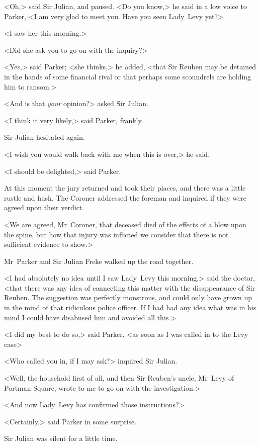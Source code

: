 <Oh,> said Sir Julian, and paused. <Do you know,> he said in a low voice to Parker, <I am very glad to meet you. Have you seen Lady~Levy yet?>

<I saw her this morning.>

<Did she ask you to go on with the inquiry?>

<Yes,> said Parker; <she thinks,> he added, <that Sir Reuben may be detained in the hands of some financial rival or that perhaps some scoundrels are holding him to ransom.>

<And is that \textit{your} opinion?> asked Sir Julian.

<I think it very likely,> said Parker, frankly.

Sir Julian hesitated again.

<I wish you would walk back with me when this is over,> he said.

<I should be delighted,> said Parker.

At this moment the jury returned and took their places, and there was a little rustle and hush. The Coroner addressed the foreman and inquired if they were agreed upon their verdict.

<We are agreed, Mr~Coroner, that deceased died of the effects of a blow upon the spine, but how that injury was inflicted we consider that there is not sufficient evidence to show.>

Mr~Parker and Sir Julian Freke walked up the road together.

<I had absolutely no idea until I saw Lady~Levy this morning,> said the doctor, <that there was any idea of connecting this matter with the disappearance of Sir Reuben. The suggestion was perfectly monstrous, and could only have grown up in the mind of that ridiculous police officer. If I had had any idea what was in his mind I could have disabused him and avoided all this.>

<I did my best to do so,> said Parker, <as soon as I was called in to the Levy case\longdash>

<Who called you in, if I may ask?> inquired Sir Julian.

<Well, the household first of all, and then Sir Reuben's uncle, Mr~Levy of Portman Square, wrote to me to go on with the investigation.>

<And now Lady~Levy has confirmed those instructions?>

<Certainly,> said Parker in some surprise.

Sir Julian was silent for a little time.

